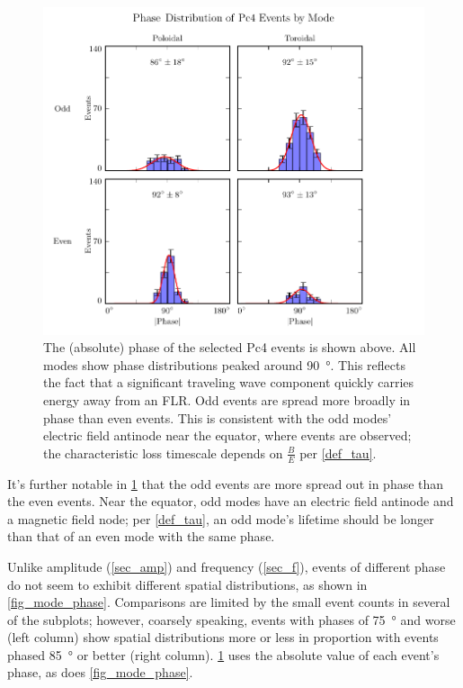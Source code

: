 \begin{figure}[!htb]
  \centering
  \includegraphics[width=\textwidth]{figures/phase.pdf}
  \caption[Phase Distribution of Pc4 Events by Mode]{
    The (absolute) phase of the selected Pc4 events is shown above. All modes
    show phase distributions peaked around \SI{90}{\degree}. This reflects the
    fact that a significant traveling wave component quickly carries energy
    away from an FLR. Odd events are spread more broadly in phase than even
    events. This is consistent with the odd modes' electric field antinode near
    the equator, where events are observed; the characteristic loss timescale
    depends on $\frac{B}{E}$ per \cref{def_tau}. 
  }
  \label{fig_phase}
\end{figure}

It's further notable in \cref{fig_phase} that the odd events are more spread
out in phase than the even events. Near the equator, odd modes have an electric
field antinode and a magnetic field node; per \cref{def_tau}, an odd mode's
lifetime should be longer than that of an even mode with the same phase. 

Unlike amplitude (\cref{sec_amp}) and frequency (\cref{sec_f}), events of
different phase do not seem to exhibit different spatial distributions, as
shown in \cref{fig_mode_phase}. Comparisons are limited by the small event
counts in several of the subplots; however, coarsely speaking, events with
phases of \SI{75}{\degree} and worse (left column) show spatial distributions
more or less in proportion with events phased \SI{85}{\degree} or better (right
column). \cref{fig_phase} uses the absolute value of each event's phase, as
does \cref{fig_mode_phase}. 

